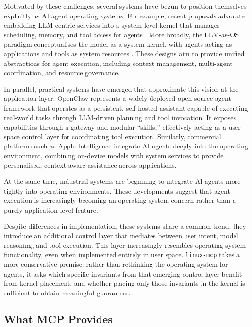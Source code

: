 Motivated by these challenges, several systems have begun to position themselves explicitly as AI agent operating systems. 
For example, recent proposals advocate embedding LLM-centric services into a system-level kernel that manages scheduling, memory, and tool access for agents \cite{packer2024memgpt, zhang2024llmos, wu2024oscopilot}. 
More broadly, the LLM-as-OS paradigm conceptualises the model as a system kernel, with agents acting as applications and tools as system resources \cite{packer2024memgpt}. 
These designs aim to provide unified abstractions for agent execution, including context management, multi-agent coordination, and resource governance.

In parallel, practical systems have emerged that approximate this vision at the application layer. 
OpenClaw\cite{openclaw2026, openclaw_security1, openclaw_security2} represents a widely deployed open-source agent framework that operates as a persistent, self-hosted assistant capable of executing real-world tasks through LLM-driven planning and tool invocation.
It exposes capabilities through a gateway and modular “skills,” effectively acting as a user-space control layer for coordinating tool execution.
Similarly, commercial platforms such as Apple Intelligence\cite{apple2024pcc} integrate AI agents deeply into the operating environment, combining on-device models with system services to provide personalised, context-aware assistance across applications.

At the same time, industrial systems are beginning to integrate AI agents more tightly into operating environments. 
These developments suggest that agent execution is increasingly becoming an operating-system concern rather than a purely application-level feature.

Despite differences in implementation, these systems share a common trend: they introduce an additional control layer that mediates between user intent, model reasoning, and tool execution.
This layer increasingly resembles operating-system functionality, even when implemented entirely in user space.
\texttt{linux-mcp} takes a more conservative premise: rather than rethinking the operating system for agents, it asks which specific invariants from that emerging control layer benefit from kernel placement, and whether placing only those invariants in the kernel is sufficient to obtain meaningful guarantees.



\subsection{What MCP Provides}

